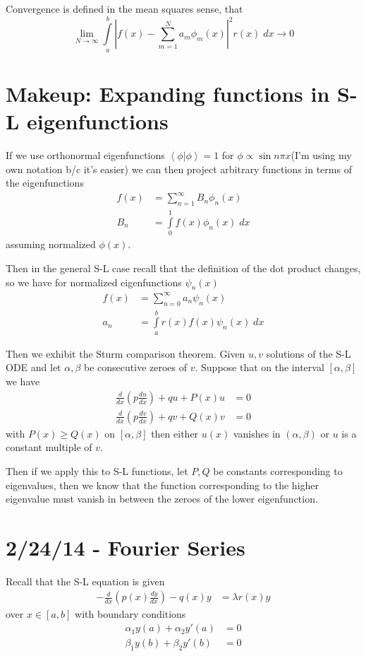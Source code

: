 \documentclass[10pt]{report}
\newcommand{\dotp}[2]{\left<#1\left.\right|#2\right>}
\newcommand{\rd}[2]{\frac{d#1}{d#2}}
\newcommand{\abs}[1]{\left|#1\right|}
\begin{document}
Convergence is defined in the mean squares sense, that
\begin{equation}
    \lim_{N \to \infty}\displaystyle\int\limits_{a}^{b}\abs{f(x) - \sum_{m=1}^{N}a_m\phi_m(x)}^2r(x)\;dx \to 0
\end{equation}
\chapter{Makeup: Expanding functions in S-L eigenfunctions}

If we use orthonormal eigenfunctions $\dotp{\phi}{\phi} = 1$ for $\phi \propto \sin n\pi x$(I'm using my own notation b/c it's easier) we can then project arbitrary functions in terms of the eigenfunctions
\begin{align}
    f(x) &= \sum_{n=1}^{\infty}B_n\phi_n(x)\\
    B_n &= \displaystyle\int\limits_{0}^{1}f(x)\phi_n(x)\;dx
\end{align}
assuming normalized $\phi(x)$.

Then in the general S-L case recall that the definition of the dot product changes, so we have for normalized eigenfunctions $\psi_n(x)$
\begin{align}
    f(x) &= \sum_{n=0}^{\infty}a_n\psi_n(x)\\
    a_n &= \displaystyle\int\limits_{a}^{b}r(x)f(x)\psi_n(x)\;dx
\end{align}

Then we exhibit the Sturm comparison theorem. Given $u,v$ solutions of the S-L ODE and let $\alpha,\beta$ be consecutive zeroes of $v$. Suppose that on the interval $[\alpha,\beta]$ we have
\begin{align}
    \rd{}{x}\left( p\rd{u}{x} \right) + qu + P(x) u &= 0\\
    \rd{}{x}\left( p\rd{v}{x} \right) + qv + Q(x) v &= 0
\end{align}
with $P(x) \geq Q(x)$ on $[\alpha,\beta]$ then either $u(x)$ vanishes in $(\alpha,\beta)$ or $u$ is a constant multiple of $v$. 

Then if we apply this to S-L functions, let $P,Q$ be constants corresponding to eigenvalues, then we know that the function corresponding to the higher eigenvalue must vanish in between the zeroes of the lower eigenfunction. 
\chapter{2/24/14 - Fourier Series}

Recall that the S-L equation is given
\begin{align}
    -\rd{}{x}\left( p(x)\rd{y}{x} \right) - q(x)y &= \lambda r(x)y
\end{align}
over $x \in [a,b]$ with boundary conditions
\begin{align}
    \alpha_1y(a) + \alpha_2y'(a) &= 0\\
    \beta_1y(b) + \beta_2y'(b) &= 0
\end{align}
\end{document}
